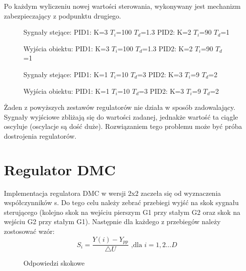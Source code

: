 Po każdym wyliczeniu nowej wartości sterowania, wykonywany jest mechanizm zabezpieczający z podpunktu drugiego.

\begin{figure}[H]
\centering

\caption{Sygnały stejące: PID1: K=3 $T_i$=100 $T_d$=1.3 PID2: K=2 $T_i$=90 $T_d$=1}
\end{figure}

\begin{figure}[H]
\centering

\caption{Wyjścia obiektu: PID1: K=3 $T_i$=100 $T_d$=1.3 PID2: K=2 $T_i$=90 $T_d$=1}
\end{figure}

\begin{figure}[H]
\centering

\caption{Sygnały stejące: PID1: K=1 $T_i$=10 $T_d$=3 PID2: K=3 $T_i$=9 $T_d$=2}
\end{figure}

\begin{figure}[H]
\centering

\caption{Wyjścia obiektu: PID1: K=1 $T_i$=10 $T_d$=3 PID2: K=3 $T_i$=9 $T_d$=2}
\end{figure}


Żaden z powyższych zestawów regulatorów nie działa w sposób zadowalający. Sygnały wyjściowe zbliżają się do wartości zadanej, jednakże wartość ta ciągle oscyluje (oscylacje są dość duże). Rozwiązaniem tego problemu może być próba dostrojenia regulatorów.

\section{Regulator DMC}
Implementacja regulatora DMC w wersji 2x2 zaczeła się od wyznaczenia współczynników s. Do tego celu należy zebrać przebiegi wyjść na skok sygnału sterującego (kolejno skok na wejściu pierszym G1 przy stałym G2 oraz skok na wejściu G2 przy stałym G1). Następnie dla każdego z przebiegów należy zostosować wzór:
\begin{equation}
S_i=\frac{Y(i)-Y_{pp}}{\triangle U} \textrm{ ,dla } i=1,2 \ldots D
\label{step_norm}
\end{equation}

\begin{figure}[H]
\centering

\caption{Odpowiedzi skokowe}
\end{figure}

